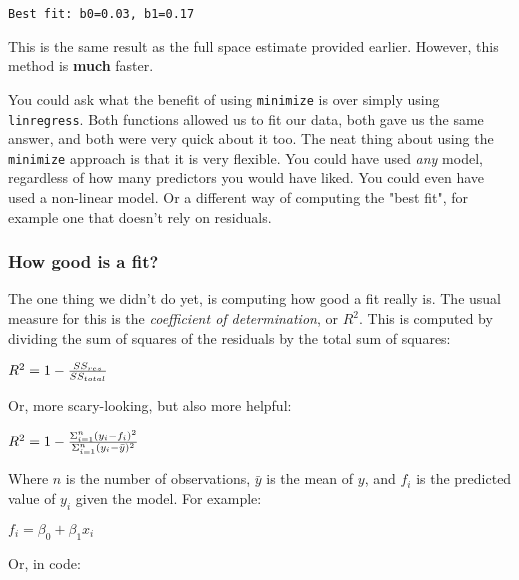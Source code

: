 \documentclass[11pt]{article}
\begin{document}
    \begin{Verbatim}[commandchars=\\\{\}]
Best fit: b0=0.03, b1=0.17

    \end{Verbatim}

    This is the same result as the full space estimate provided earlier.
However, this method is \textbf{much} faster.

You could ask what the benefit of using \texttt{minimize} is over simply
using \texttt{linregress}. Both functions allowed us to fit our data,
both gave us the same answer, and both were very quick about it too. The
neat thing about using the \texttt{minimize} approach is that it is very
flexible. You could have used \emph{any} model, regardless of how many
predictors you would have liked. You could even have used a non-linear
model. Or a different way of computing the "best fit", for example one
that doesn't rely on residuals.

    \subsubsection{How good is a fit?}\label{how-good-is-a-fit}

The one thing we didn't do yet, is computing how good a fit really is.
The usual measure for this is the \emph{coefficient of determination},
or \(R^{2}\). This is computed by dividing the sum of squares of the
residuals by the total sum of squares:

\(R^{2} = 1 - {{SS_{res}} \over {SS_{total}}}\)

Or, more scary-looking, but also more helpful:

\(R^{2} = 1 - { { \Sigma^{n}_{i=1} (y_{i} - f_{i})^{2} } \over { \Sigma^{n}_{i=1}(y_{i} - \bar{y})^{2} }}\)

Where \(n\) is the number of observations, \(\bar{y}\) is the mean of
\(y\), and \(f_{i}\) is the predicted value of \(y_{i}\) given the
model. For example:

\(f_{i} = \beta_{0} + \beta_{1} x_{i}\)

Or, in code:
\end{document}
